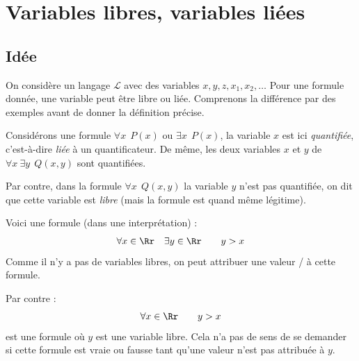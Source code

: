 \documentclass[11pt,class=report,crop=false]{standalone}
\begin{document}





\section{Variables libres, variables liées}

\subsection{Idée}

On considère un langage $\mathcal{L}$ avec des variables $x,y,z,x_1,x_2,\ldots$
Pour une formule donnée, une variable peut être libre ou liée.
Comprenons la différence par des exemples avant de donner la définition précise.

Considérons une formule \og{}$\forall x \ \ P(x)$\fg{} ou \og{}$\exists x \ \ P(x)$\fg{},
la variable \og{}$x$\fg{} est ici \emph{quantifiée}, c'est-à-dire \emph{liée} à un quantificateur.
De même, les deux variables $x$ et $y$ de \og{}$\forall x \ \exists y \ \ Q(x,y)$\fg{} sont quantifiées.

Par contre, dans la formule \og{}$\forall x \ \ Q(x,y)$\fg{} la variable $y$ n'est pas quantifiée,
on dit que cette variable est \emph{libre} (mais la formule est quand même légitime).

Voici une formule (dans une interprétation) :
\[
\forall x \in \Rr \quad \exists y \in \Rr \qquad y > x
\]
Comme il n'y a pas de variables libres, on peut attribuer une valeur \ltrue/\lfalse{} à cette formule.

Par contre :
\[
\forall x \in \Rr  \qquad y > x
\]
est une formule où $y$ est une variable libre. 
Cela n'a pas de sens de se demander si cette formule est vraie ou fausse tant qu'une valeur n'est pas attribuée à $y$.
\end{document}
